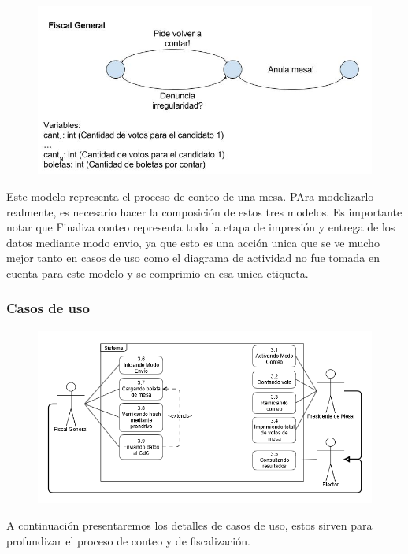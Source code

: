 \begin{figure}[h!]
\centering
\includegraphics[scale=0.5]{imagenes/FSMs/Conteo/Conteodevotosdeunamesa3}
\end{figure}			
Este modelo representa el proceso de conteo de una mesa. PAra modelizarlo realmente, es necesario hacer la composición de estos tres modelos. Es importante notar que Finaliza conteo representa todo la etapa de impresión y entrega de los datos mediante modo envio, ya que esto es una acción unica que se ve mucho mejor tanto en casos de uso como el diagrama de actividad no fue tomada en cuenta para este modelo y se comprimio en esa unica etiqueta.

\subsubsection{Casos de uso}

\begin{figure}[h!]
\centering
\includegraphics[scale=0.5]{imagenes/CU/casosdeusoconteo}
\end{figure}			

A continuación presentaremos los detalles de casos de uso, estos sirven para profundizar el proceso de conteo y de fiscalización.

